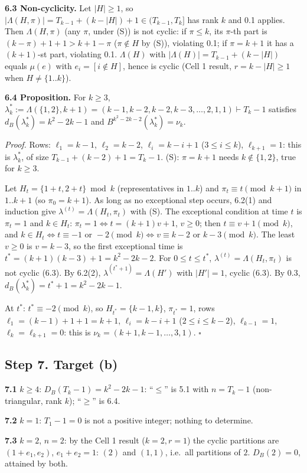 \documentclass[11pt]{article}
\begin{document}
\textbf{6.3 Non-cyclicity.} Let $|H|\ge1$, so $|\Lambda(H,\pi)|=T_{k-1}+(k-|H|)+1\in(T_{k-1},T_k]$ has rank $k$ and 0.1 applies. Then $\Lambda(H,\pi)$ (any $\pi$, under (S)) is not cyclic: if $\pi\le k$, its $\pi$-th part is $(k-\pi)+1+1>k+1-\pi$ ($\pi\notin H$ by (S)), violating 0.1; if $\pi=k+1$ it has a $(k+1)$-st part, violating 0.1. $\Lambda(H)$ with $|\Lambda(H)|=T_{k-1}+(k-|H|)$ equals $\mu(e)$ with $e_i=[i\notin H]$, hence is cyclic (Cell 1 result, $r=k-|H|\ge1$ when $H\ne\{1..k\}$).

\textbf{6.4 Proposition.} For $k\ge3$, $\lambda^*_k:=\Lambda(\{1,2\},k+1)=(k-1,k-2,k-2,k-3,\dots,2,1,1)\vdash T_k-1$ satisfies $d_B(\lambda^*_k)=k^2-2k-1$ and $B^{k^2-2k-2}(\lambda^*_k)=\nu_k$.

\emph{Proof.} Rows: $\ell_1=k-1$, $\ell_2=k-2$, $\ell_i=k-i+1$ ($3\le i\le k$), $\ell_{k+1}=1$: this is $\lambda^*_k$, of size $T_{k-1}+(k-2)+1=T_k-1$. (S): $\pi=k+1$ needs $k\notin\{1,2\}$, true for $k\ge3$.

Let $H_t=\{1+t,2+t\}\bmod k$ (representatives in $1..k$) and $\pi_t\equiv t\pmod{k+1}$ in $1..k+1$ (so $\pi_0=k+1$). As long as no exceptional step occurs, 6.2(1) and induction give $\lambda^{(t)}=\Lambda(H_t,\pi_t)$ with (S). The exceptional condition at time $t$ is $\pi_t=1$ and $k\in H_t$: $\pi_t=1\iff t=(k+1)v+1$, $v\ge0$; then $t\equiv v+1\pmod k$, and $k\in H_t\iff t\equiv-1\text{ or }-2\pmod k\iff v\equiv k-2\text{ or }k-3\pmod k$. The least $v\ge0$ is $v=k-3$, so the first exceptional time is $t^*=(k+1)(k-3)+1=k^2-2k-2$. For $0\le t\le t^*$, $\lambda^{(t)}=\Lambda(H_t,\pi_t)$ is not cyclic (6.3). By 6.2(2), $\lambda^{(t^*+1)}=\Lambda(H')$ with $|H'|=1$, cyclic (6.3). By 0.3, $d_B(\lambda^*_k)=t^*+1=k^2-2k-1$.

At $t^*$: $t^*\equiv-2\pmod k$, so $H_{t^*}=\{k-1,k\}$, $\pi_{t^*}=1$, rows $\ell_1=(k-1)+1+1=k+1$, $\ell_i=k-i+1$ ($2\le i\le k-2$), $\ell_{k-1}=1$, $\ell_k=\ell_{k+1}=0$: this is $\nu_k=(k+1,k-1,\dots,3,1)$. $\square$

\subsection*{Step 7. Target (b)}
\textbf{7.1} $k\ge4$: $D_B(T_k-1)=k^2-2k-1$: ``$\le$'' is 5.1 with $n=T_k-1$ (non-triangular, rank $k$); ``$\ge$'' is 6.4.

\textbf{7.2} $k=1$: $T_1-1=0$ is not a positive integer; nothing to determine.

\textbf{7.3} $k=2$, $n=2$: by the Cell 1 result ($k=2,r=1$) the cyclic partitions are $(1+e_1,e_2)$, $e_1+e_2=1$: $(2)$ and $(1,1)$, i.e.\ all partitions of $2$. $D_B(2)=0$, attained by both.
\end{document}
